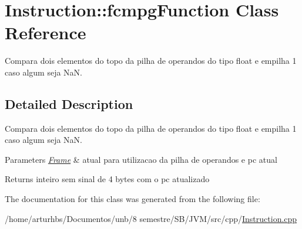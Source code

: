 \hypertarget{classInstruction_1_1fcmpgFunction}{}\section{Instruction\+:\+:fcmpg\+Function Class Reference}
\label{classInstruction_1_1fcmpgFunction}


Compara dois elementos do topo da pilha de operandos do tipo float e empilha 1 caso algum seja NaN.  




\subsection{Detailed Description}
Compara dois elementos do topo da pilha de operandos do tipo float e empilha 1 caso algum seja NaN. 


\begin{DoxyParams}{Parameters}
{\em \hyperlink{classFrame}{Frame}} & atual para utilizacao da pilha de operandos e pc atual \\
\hline
\end{DoxyParams}
\begin{DoxyReturn}{Returns}
inteiro sem sinal de 4 bytes com o pc atualizado 
\end{DoxyReturn}


The documentation for this class was generated from the following file\+:\begin{DoxyCompactItemize}
\item 
/home/arturhbs/\+Documentos/unb/8 semestre/\+S\+B/\+J\+V\+M/src/cpp/\hyperlink{Instruction_8cpp}{Instruction.\+cpp}\end{DoxyCompactItemize}
